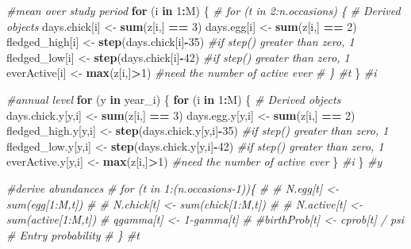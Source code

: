 \documentclass[]{article}
\newenvironment{Shaded}{\begin{snugshade}}{\end{snugshade}}
\newcommand{\KeywordTok}[1]{\textcolor[rgb]{0.13,0.29,0.53}{\textbf{#1}}}
\newcommand{\DecValTok}[1]{\textcolor[rgb]{0.00,0.00,0.81}{#1}}
\newcommand{\StringTok}[1]{\textcolor[rgb]{0.31,0.60,0.02}{#1}}
\newcommand{\CommentTok}[1]{\textcolor[rgb]{0.56,0.35,0.01}{\textit{#1}}}
\newcommand{\ControlFlowTok}[1]{\textcolor[rgb]{0.13,0.29,0.53}{\textbf{#1}}}
\newcommand{\OperatorTok}[1]{\textcolor[rgb]{0.81,0.36,0.00}{\textbf{#1}}}
\newcommand{\NormalTok}[1]{#1}
\begin{document}
\begin{Shaded}
\begin{Highlighting}[]
\CommentTok{#mean over study period}
\ControlFlowTok{for}\NormalTok{ (i }\ControlFlowTok{in} \DecValTok{1}\OperatorTok{:}\NormalTok{M) \{}
  \CommentTok{# for (t in 2:n.occasions) \{}
    \CommentTok{# Derived objects}
\NormalTok{  days.chick[i] <-}\StringTok{ }\KeywordTok{sum}\NormalTok{(z[i,] }\OperatorTok{==}\StringTok{ }\DecValTok{3}\NormalTok{)}
\NormalTok{  days.egg[i] <-}\StringTok{ }\KeywordTok{sum}\NormalTok{(z[i,] }\OperatorTok{==}\StringTok{ }\DecValTok{2}\NormalTok{)}
\NormalTok{  fledged_high[i] <-}\StringTok{ }\KeywordTok{step}\NormalTok{(days.chick[i]}\OperatorTok{-}\DecValTok{35}\NormalTok{) }\CommentTok{#if step() greater than zero, 1}
\NormalTok{  fledged_low[i] <-}\StringTok{ }\KeywordTok{step}\NormalTok{(days.chick[i]}\OperatorTok{-}\DecValTok{42}\NormalTok{) }\CommentTok{#if step() greater than zero, 1}
\NormalTok{  everActive[i] <-}\StringTok{ }\KeywordTok{max}\NormalTok{(z[i,]}\OperatorTok{>}\DecValTok{1}\NormalTok{) }\CommentTok{#need the number of active ever}
  \CommentTok{# \} #t}
\NormalTok{ \} }\CommentTok{#i}

\CommentTok{#annual level}
\ControlFlowTok{for}\NormalTok{ (y }\ControlFlowTok{in}\NormalTok{ year_i) \{}
  \ControlFlowTok{for}\NormalTok{ (i }\ControlFlowTok{in} \DecValTok{1}\OperatorTok{:}\NormalTok{M) \{}
    \CommentTok{# Derived objects}
\NormalTok{  days.chick.y[y,i] <-}\StringTok{ }\KeywordTok{sum}\NormalTok{(z[i,] }\OperatorTok{==}\StringTok{ }\DecValTok{3}\NormalTok{)}
\NormalTok{  days.egg.y[y,i] <-}\StringTok{ }\KeywordTok{sum}\NormalTok{(z[i,] }\OperatorTok{==}\StringTok{ }\DecValTok{2}\NormalTok{)}
\NormalTok{  fledged_high.y[y,i] <-}\StringTok{ }\KeywordTok{step}\NormalTok{(days.chick.y[y,i]}\OperatorTok{-}\DecValTok{35}\NormalTok{) }\CommentTok{#if step() greater than zero, 1}
\NormalTok{  fledged_low.y[y,i] <-}\StringTok{ }\KeywordTok{step}\NormalTok{(days.chick.y[y,i]}\OperatorTok{-}\DecValTok{42}\NormalTok{) }\CommentTok{#if step() greater than zero, 1}
\NormalTok{  everActive.y[y,i] <-}\StringTok{ }\KeywordTok{max}\NormalTok{(z[i,]}\OperatorTok{>}\DecValTok{1}\NormalTok{) }\CommentTok{#need the number of active ever}
\NormalTok{  \} }\CommentTok{#i}
\NormalTok{ \} }\CommentTok{#y}

\CommentTok{#derive abundances }
\CommentTok{#  for (t in 1:(n.occasions-1))\{}
\CommentTok{#   # N.egg[t]    <- sum(egg[1:M,t])}
\CommentTok{#   # N.chick[t]  <- sum(chick[1:M,t])}
\CommentTok{#   # N.active[t] <- sum(active[1:M,t])}
\CommentTok{#   qgamma[t] <- 1-gamma[t] }
\CommentTok{#   #birthProb[t] <- cprob[t] / psi      # Entry probability}
\CommentTok{# \} #t}


\end{Highlighting}
\end{Shaded}
\end{document}
